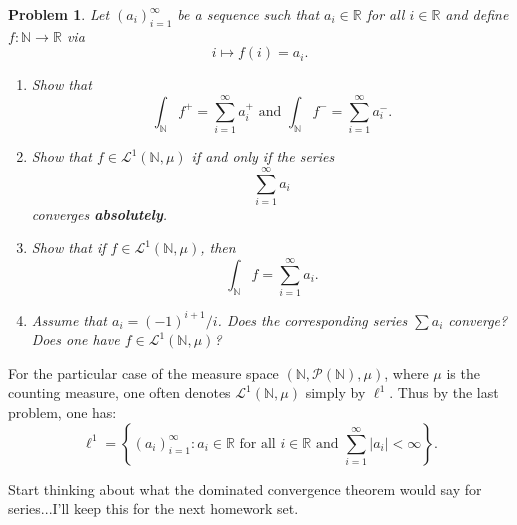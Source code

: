 \documentclass[reqno]{amsart}
\theoremstyle{plain}
\newtheorem{problem}{Problem}
\theoremstyle{definition}
\begin{document}
\begin{problem}
Let $(a_{i})_{i=1}^{\infty}$ be a sequence such that $a_{i} \in \mathbb{R}$ for all $i \in \mathbb{R}$ and define $f:\mathbb{N} \rightarrow \mathbb{R}$ via 
$$i \mapsto f(i) = a_{i}. $$
\begin{enumerate}
\item Show that
$$\int_{\mathbb{N}}f^{+} = \sum_{i=1}^{\infty}a_{i}^{+} \text{ and } \int_{\mathbb{N}}f^{-} = \sum_{i=1}^{\infty}a_{i}^{-}. $$
\item Show that $f \in \mathcal{L}^{1}(\mathbb{N},\mu)$ if and only if the series 
$$\sum_{i=1}^{\infty}a_{i} $$
converges {\bfseries absolutely}.
\item Show that if $f \in \mathcal{L}^{1}(\mathbb{N},\mu)$, then
$$\int_{\mathbb{N}}f = \sum_{i=1}^{\infty}a_{i}. $$
\item Assume that $a_{i} = (-1)^{i+1}/i$.  Does the corresponding series $\sum a_{i}$ converge?  Does one have $f \in \mathcal{L}^{1}(\mathbb{N},\mu)$?
\end{enumerate}

\end{problem}

For the particular case of the measure space $(\mathbb{N},\mathcal{P}(\mathbb{N}),\mu)$, where $\mu$ is the counting measure, one often denotes $\mathcal{L}^{1}(\mathbb{N},\mu)$ simply by $\ell^{1}$.  Thus by the last problem, one has:
$$\ell^{1} = \left\{ (a_{i})_{i=1}^{\infty}: a_{i}\in \mathbb{R} \text{ for all } i \in \mathbb{R} \text{ and } \sum_{i=1}^{\infty}|a_{i}|< \infty \right\}. $$

Start thinking about what the dominated convergence theorem would say for series...I'll keep this for the next homework set.
\end{document}
